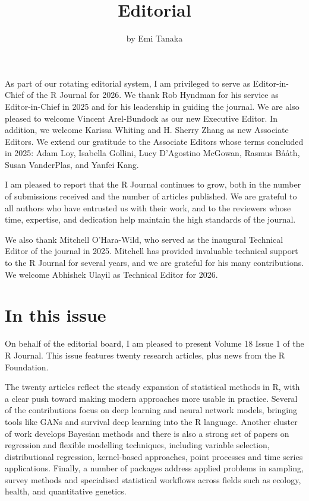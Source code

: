 \title{Editorial}


\author{by Emi Tanaka}

\maketitle


As part of our rotating editorial system, I am privileged to serve as Editor-in-Chief of the R Journal for 2026. We thank Rob Hyndman for his service as Editor-in-Chief in 2025 and for his leadership in guiding the journal. We are also pleased to welcome Vincent Arel-Bundock as our new Executive Editor. In addition, we welcome Karissa Whiting and H. Sherry Zhang as new Associate Editors. We extend our gratitude to the Associate Editors whose terms concluded in 2025: Adam Loy, Isabella Gollini, Lucy D'Agostino McGowan, Rasmus Bååth, Susan VanderPlas, and Yanfei Kang.

I am pleased to report that the R Journal continues to grow, both in the number of submissions received and the number of articles published. We are grateful to all authors who have entrusted us with their work, and to the reviewers whose time, expertise, and dedication help maintain the high standards of the journal.

We also thank Mitchell O'Hara-Wild, who served as the inaugural Technical Editor of the journal in 2025. Mitchell has provided invaluable technical support to the R Journal for several years, and we are grateful for his many contributions. We welcome Abhishek Ulayil as Technical Editor for 2026.

\section*{In this issue}\label{in-this-issue}

On behalf of the editorial board, I am pleased to present Volume 18 Issue 1 of the R Journal. This issue features twenty research articles, plus news from the R Foundation.

The twenty articles reflect the steady expansion of statistical methods in R, with a clear push toward making modern approaches more usable in practice. Several of the contributions focus on deep learning and neural network models, bringing tools like GANs and survival deep learning into the R language. Another cluster of work develops Bayesian methods and there is also a strong set of papers on regression and flexible modelling techniques, including variable selection, distributional regression, kernel-based approaches, point processes and time series applications. Finally, a number of packages address applied problems in sampling, survey methods and specialised statistical workflows across fields such as ecology, health, and quantitative genetics.

